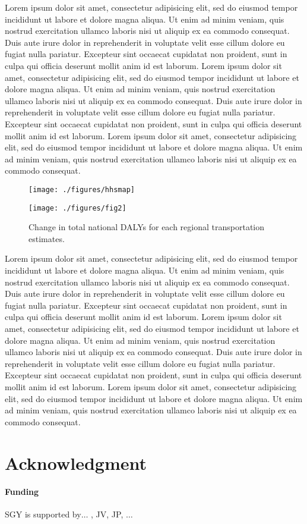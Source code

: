 \documentclass{bioinfo}
\begin{document}
Lorem ipsum dolor sit amet, consectetur adipisicing elit, sed do
eiusmod tempor incididunt ut labore et dolore magna aliqua. Ut enim ad
minim veniam, quis nostrud exercitation ullamco laboris nisi ut
aliquip ex ea commodo consequat. Duis aute irure dolor in
reprehenderit in voluptate velit esse cillum dolore eu fugiat nulla
pariatur. Excepteur sint occaecat cupidatat non proident, sunt in
culpa qui officia deserunt mollit anim id est laborum. Lorem ipsum
dolor sit amet, consectetur adipisicing elit, sed do eiusmod tempor
incididunt ut labore et dolore magna aliqua. Ut enim ad minim veniam,
quis nostrud exercitation ullamco laboris nisi ut aliquip ex ea
commodo consequat. Duis aute irure dolor in reprehenderit in voluptate
velit esse cillum dolore eu fugiat nulla pariatur. Excepteur sint
occaecat cupidatat non proident, sunt in culpa qui officia deserunt
mollit anim id est laborum. Lorem ipsum dolor sit amet, consectetur
adipisicing elit, sed do eiusmod tempor incididunt ut labore et dolore
magna aliqua. Ut enim ad minim veniam, quis nostrud exercitation
ullamco laboris nisi ut aliquip ex ea commodo consequat.

\begin{figure}[t]
    \centerline{\texttt{[image: ./figures/hhsmap]}}\centerline{\texttt{[image: ./figures/fig2]}}
    \caption{Change in total national DALYs for each regional transportation
estimates.
}\label{dalyFigure}
\end{figure}

Lorem ipsum dolor sit amet, consectetur adipisicing elit, sed do
eiusmod tempor incididunt ut labore et dolore magna aliqua. Ut enim ad
minim veniam, quis nostrud exercitation ullamco laboris nisi ut
aliquip ex ea commodo consequat. Duis aute irure dolor in
reprehenderit in voluptate velit esse cillum dolore eu fugiat nulla
pariatur. Excepteur sint occaecat cupidatat non proident, sunt in
culpa qui officia deserunt mollit anim id est laborum. Lorem ipsum
dolor sit amet, consectetur adipisicing elit, sed do eiusmod tempor
incididunt ut labore et dolore magna aliqua. Ut enim ad minim veniam,
quis nostrud exercitation ullamco laboris nisi ut aliquip ex ea
commodo consequat. Duis aute irure dolor in reprehenderit in voluptate
velit esse cillum dolore eu fugiat nulla pariatur. Excepteur sint
occaecat cupidatat non proident, sunt in culpa qui officia deserunt
mollit anim id est laborum. Lorem ipsum dolor sit amet, consectetur
adipisicing elit, sed do eiusmod tempor incididunt ut labore et dolore
magna aliqua. Ut enim ad minim veniam, quis nostrud exercitation
ullamco laboris nisi ut aliquip ex ea commodo consequat.

\section*{Acknowledgment}
\paragraph{Funding\textcolon} SGY is supported by$\ldots$ , JV, JP, $\ldots$


%
%

\end{document}
